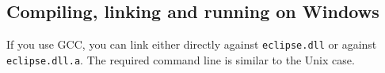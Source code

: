%
%


\subsection{Compiling, linking and running on Windows}

If you use GCC, you can link either directly against \verb+eclipse.dll+
or against \verb+eclipse.dll.a+.
The required command line is similar to the Unix case.

